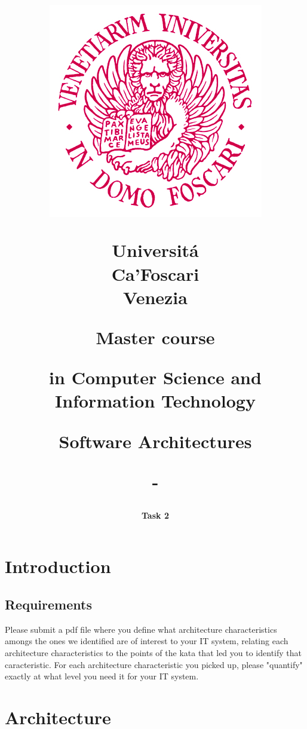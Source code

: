 \documentclass[a4paper,11pt]{report}
\title{
	\begin{figure}[!h]
		\vspace{-65mm}  
		\hspace{-30mm}
		\includegraphics[width=0.2\linewidth]{img/logo.jpg} \newline
		\hspace{-30mm}
		\label{fig:logo}
	\end{figure}
	\begin{flushleft}
		\vspace{-11mm}  
		\hspace{-30mm}
		\fontfamily{roboto}\selectfont Universit\'{a} \\
		\hspace{-30mm}
		Ca'Foscari\\
		\hspace{-30mm}
		Venezia\\
	\end{flushleft}
	\vspace{25mm}  
	\centerline{Master course}
	\vspace{5mm}
	\centerline{in Computer Science and Information Technology}
	\vspace{30mm}
	\centerline{Software Architectures}
	\vspace{5mm}
	\centerline{-}
}
\author{
	\LARGE \textbf{Task 2} \newline
}
\date{
	\begin{flushleft}
		\vspace{30mm}
		\hspace*{-25mm}
		\textbf{Group 5} \newline
		\hspace*{-25mm}
		Bastianello Lorenzo, 874268\newline
		\hspace*{-25mm} 
		Bonomi Silvia, 867138\newline
		\hspace*{-25mm} 
		Bruno Francesco, 875812\newline
		\hspace*{-25mm} 
		Quaglia Beatrice Maria, 875332\newline
		\vspace{2mm} \newline
		\hspace*{-25mm}
		\textbf{Academic Year} \newline
		\hspace*{-25mm}
		2022 / 2023
	\end{flushleft}
}
\begin{document}
	\maketitle
	\chapter*{Introduction}
	\section*{Requirements}
	Please submit a pdf file where you define what architecture characteristics amongs the ones we identified are of interest to your IT system, relating each architecture characteristics to the points of the kata that led you to identify that caracteristic. For each architecture characteristic you picked up, please "quantify" exactly at what level you need it for your IT system.
	\chapter*{Architecture}
\end{document}
